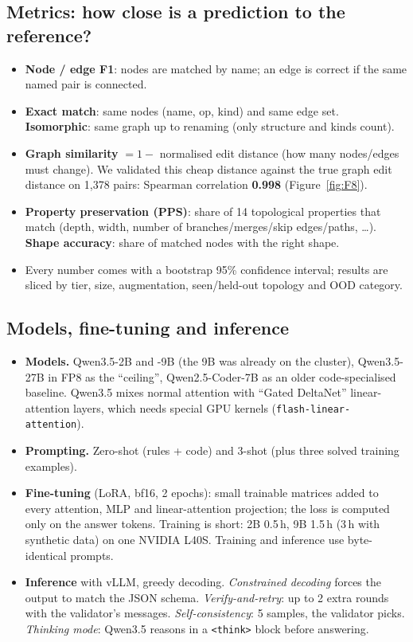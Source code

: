 \documentclass[11pt,a4paper]{article}
\begin{document}
\subsection{Metrics: how close is a prediction to the reference?}
\begin{itemize}[leftmargin=*]
\item \textbf{Node / edge F1}: nodes are matched by name; an edge is correct if the same named pair is connected.
\item \textbf{Exact match}: same nodes (name, op, kind) and same edge set. \textbf{Isomorphic}: same graph up to renaming
(only structure and kinds count).
\item \textbf{Graph similarity} $=1-$ normalised edit distance (how many nodes/edges must change). We validated this
cheap distance against the true graph edit distance on 1{,}378 pairs: Spearman correlation \textbf{0.998}
(Figure~\ref{fig:F8}).
\item \textbf{Property preservation (PPS)}: share of 14 topological properties that match (depth, width, number of
branches/merges/skip edges/paths, \dots). \textbf{Shape accuracy}: share of matched nodes with the right shape.
\item Every number comes with a bootstrap 95\% confidence interval; results are sliced by tier, size, augmentation,
seen/held-out topology and OOD category.
\end{itemize}

\subsection{Models, fine-tuning and inference}
\begin{itemize}[leftmargin=*]
\item \textbf{Models.} Qwen3.5-2B and -9B (the 9B was already on the cluster), Qwen3.5-27B in FP8 as the ``ceiling'',
Qwen2.5-Coder-7B as an older code-specialised baseline. Qwen3.5 mixes normal attention with ``Gated DeltaNet''
linear-attention layers, which needs special GPU kernels (\texttt{flash-linear-attention}).
\item \textbf{Prompting.} Zero-shot (rules + code) and 3-shot (plus three solved training examples).
\item \textbf{Fine-tuning} (LoRA, bf16, 2 epochs): small trainable matrices added to every attention, MLP and
linear-attention projection; the loss is computed only on the answer tokens. Training is short: 2B 0.5\,h, 9B 1.5\,h
(3\,h with synthetic data) on one NVIDIA L40S. Training and inference use byte-identical prompts.
\item \textbf{Inference} with vLLM, greedy decoding. \emph{Constrained decoding} forces the output to match the JSON
schema. \emph{Verify-and-retry}: up to 2 extra rounds with the validator's messages. \emph{Self-consistency}: 5 samples,
the validator picks. \emph{Thinking mode}: Qwen3.5 reasons in a \texttt{<think>} block before answering.
\end{itemize}
\end{document}
